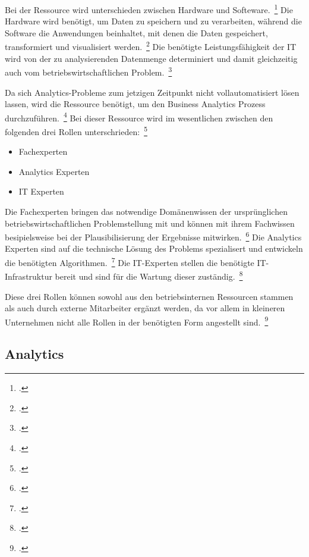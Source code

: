 Bei der Ressource \grqq wird unterschieden zwischen Hardware und Softeware.~\footcite[\vglf][]{seiter.2019}
Die Hardware wird benötigt, um Daten zu speichern und zu verarbeiten, während die Software die Anwendungen beinhaltet,
mit denen die Daten gespeichert, transformiert und visualisiert werden.~\footcite[\vglf][]{seiter.2019}
Die benötigte Leistungsfähigkeit der IT wird von der zu analysierenden Datenmenge determiniert und damit gleichzeitig auch
vom betriebswirtschaftlichen Problem.~\footcite[\vglf][]{seiter.2019}

Da sich Analytics-Probleme zum jetzigen Zeitpunkt nicht vollautomatisiert lösen lassen, wird die Ressource \grqq
benötigt, um den Business Analytics Prozess durchzuführen.~\footcite[\vglf][]{seiter.2019}
Bei dieser Ressource wird im wesentlichen zwischen den folgenden drei Rollen unterschrieden:~\footcite[\vglf][-30]{seiter.2019}
\begin{itemize}
    \item Fachexperten
    \item Analytics Experten
    \item IT Experten
\end{itemize}
Die Fachexperten bringen das notwendige Domänenwissen der ursprünglichen betriebswirtschaftlichen Problemstellung mit
und können mit ihrem Fachwissen besipielsweise bei der Plausibilisierung der Ergebnisse mitwirken.~\footcite[\vglf]
[]{seiter.2019}
Die Analytics Experten sind auf die technische Lösung des Problems spezialisert und entwickeln die benötigten
Algorithmen.~\footcite[\vglf][]{seiter.2019}
Die IT-Experten stellen die benötigte IT-Infrastruktur bereit und sind für die Wartung dieser zuständig.~\footcite[\vglf]
[]{seiter.2019}

Diese drei Rollen können sowohl aus den betriebsinternen Ressourcen stammen als auch durch externe Mitarbeiter ergänzt
werden, da vor allem in kleineren Unternehmen nicht alle Rollen in der benötigten Form angestellt sind.~\footcite[\vglf]
[]{seiter.2019}

\subsection{Analytics} \label{sec: t_Analytics}


